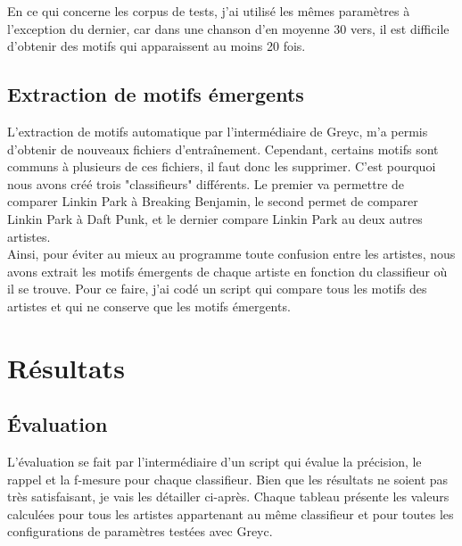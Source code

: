 \documentclass[a4paper]{article}
\begin{document}
	En ce qui concerne les corpus de tests, j'ai utilisé les mêmes paramètres à l'exception du dernier, car dans une chanson d'en moyenne 30 vers, il est difficile d'obtenir des motifs qui apparaissent au moins 20 fois.
	
	\subsection{Extraction de motifs émergents}
	
	L'extraction de motifs automatique par l'intermédiaire de Greyc, m'a permis d'obtenir de nouveaux fichiers d'entraînement. Cependant, certains motifs sont communs à plusieurs de ces fichiers, il faut donc les supprimer. C'est pourquoi nous avons créé trois "classifieurs" différents. Le premier va permettre de comparer Linkin Park à Breaking Benjamin, le second permet de comparer Linkin Park à Daft Punk, et le dernier compare Linkin Park au deux autres artistes.\\
	
	Ainsi, pour éviter au mieux au programme toute confusion entre les artistes, nous avons extrait les motifs émergents de chaque artiste en fonction du classifieur où il se trouve. Pour ce faire, j'ai codé un script qui compare tous les motifs des artistes et qui ne conserve que les motifs émergents.
	
	\section{Résultats}
	
	\subsection{\'Evaluation}
	
	L'évaluation se fait par l'intermédiaire d'un script qui évalue la précision, le rappel et la f-mesure pour chaque classifieur. Bien que les résultats ne soient pas très satisfaisant, je vais les détailler ci-après. Chaque tableau présente les valeurs calculées pour tous les artistes appartenant au même classifieur et pour toutes les configurations de paramètres testées avec Greyc. 
	
\end{document}
